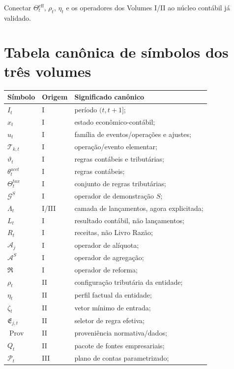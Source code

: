 \documentclass[11pt,a4paper]{article}
\newcommand{\cT}{\mathcal{T}}
\newcommand{\cG}{\mathcal{G}}
\newcommand{\cA}{\mathcal{A}}
\newcommand{\Prov}{\operatorname{Prov}}
\newcommand{\Plano}{\mathcal{P}}
\begin{document}
Conectar $\Theta_t^{\mathrm{eff}}$, $\rho_t$, $\eta_t$ e os operadores dos Volumes I/II ao núcleo contábil já validado.

\appendix
\section{Tabela canônica de símbolos dos três volumes}

\small
\begin{longtable}{p{} p{} p{}}
\toprule
\textbf{Símbolo} & \textbf{Origem} & \textbf{Significado canônico}\\
\midrule
$I_t$ & I & período $(t,t+1]$;\\
$x_t$ & I & estado econômico-contábil;\\
$u_t$ & I & família de eventos/operações e ajustes;\\
$\cT_{k,t}$ & I & operação/evento elementar;\\
$\vartheta_t$ & I & regras contábeis e tributárias;\\
$\theta_t^{acct}$ & I & regras contábeis;\\
$\Theta_t^{tax}$ & I & conjunto de regras tributárias;\\
$\cG^S$ & I & operador de demonstração $S$;\\
$\Lambda_t$ & I/III & camada de lançamentos, agora explicitada;\\
$L_t$ & I & resultado contábil, não lançamentos;\\
$R_t$ & I & receitas, não Livro Razão;\\
$\cA_j$ & I & operador de alíquota;\\
$\cA^S$ & I & operador de agregação;\\
$\mathfrak R$ & I & operador de reforma;\\
$\rho_t$ & II & configuração tributária da entidade;\\
$\eta_t$ & II & perfil factual da entidade;\\
$\zeta_t$ & II & vetor mínimo de entrada;\\
$\mathfrak E_{j,t}$ & II & seletor de regra efetiva;\\
$\Prov$ & II & proveniência normativa/dados;\\
$Q_t$ & II & pacote de fontes empresariais;\\
$\Plano_t$ & III & plano de contas parametrizado;\\

\end{longtable}
\end{document}
